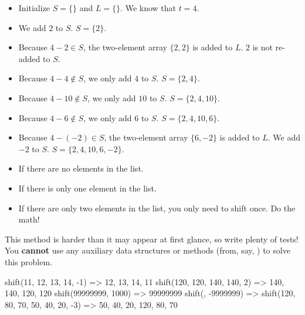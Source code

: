 \begin{itemize}
    \item Initialize $S=\{\}$ and $L=\{\}$. We know that $t=4$.
    \item We add $2$ to $S$. $S=\{2\}$.
    \item Because $4-2\in{S}$, the two-element array $\{2, 2\}$ is added to $L$. $2$ is not re-added to $S$.
    \item Because $4-4\not\in{S}$, we only add $4$ to $S$. $S=\{2, 4\}$.
    \item Because $4-10\not\in{S}$, we only add $10$ to $S$. $S=\{2, 4, 10\}$.
    \item Because $4-6\not\in{S}$, we only add $6$ to $S$. $S=\{2, 4, 10, 6\}$.
    \item Because $4-(-2)\in{S}$, the two-element array $\{6, -2\}$ is added to $L$. We add $-2$ to $S$. $S=\{2, 4, 10, 6, -2\}$.
\end{itemize}

\begin{itemize}
    \item If there are no elements in the list.
    \item If there is only one element in the list.
    \item If there are only two elements in the list, you only need to shift once. Do the math!
\end{itemize}
    
This method is harder than it may appear at first glance, so write plenty of tests! You \textbf{cannot} use any auxiliary data structures or methods (from, say, ) to solve this problem.

\begin{verbnobox}[\small]
shift({11, 12, 13, 14}, -1)          => {12, 13, 14, 11}
shift({120, 120, 140, 140}, 2)       => {140, 140, 120, 120}
shift({99999999}, 1000)              => {99999999}
shift({}, -9999999)                  => {}
shift({120, 80, 70, 50, 40, 20}, -3) => {50, 40, 20, 120, 80, 70}
\end{verbnobox}


